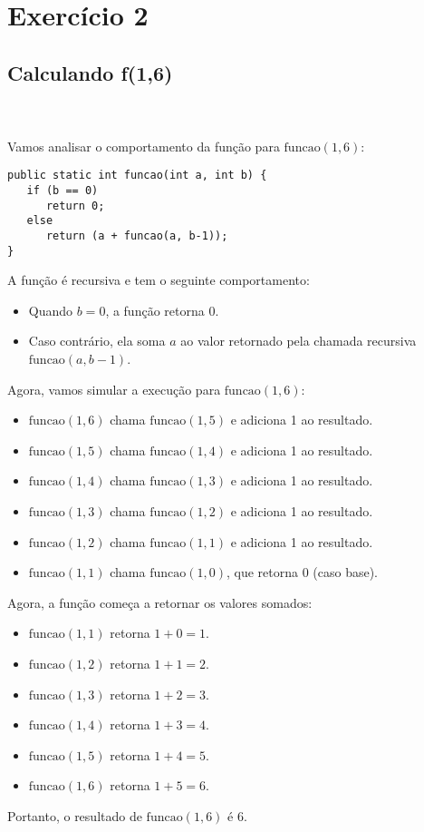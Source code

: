 \documentclass[11pt,reqno,a4paper]{amsart}
\begin{document}
\newpage
\section{Exercício 2}
\subsection{Calculando f(1,6)}
\
\\
\\
Vamos analisar o comportamento da função para \( \text{funcao}(1, 6) \):

\begin{verbatim}
public static int funcao(int a, int b) {
   if (b == 0)
      return 0;
   else
      return (a + funcao(a, b-1));
}    
\end{verbatim}

A função é recursiva e tem o seguinte comportamento:
\begin{itemize}
  \item Quando \( b = 0 \), a função retorna 0.
  \item Caso contrário, ela soma \( a \) ao valor retornado pela chamada recursiva \( \text{funcao}(a, b-1) \).
\end{itemize}

Agora, vamos simular a execução para \( \text{funcao}(1, 6) \):
\begin{itemize}
    \item \( \text{funcao}(1, 6) \) chama \( \text{funcao}(1, 5) \) e adiciona 1 ao resultado.
    \item \( \text{funcao}(1, 5) \) chama \( \text{funcao}(1, 4) \) e adiciona 1 ao resultado.
    \item \( \text{funcao}(1, 4) \) chama \( \text{funcao}(1, 3) \) e adiciona 1 ao resultado.
    \item \( \text{funcao}(1, 3) \) chama \( \text{funcao}(1, 2) \) e adiciona 1 ao resultado.
    \item \( \text{funcao}(1, 2) \) chama \( \text{funcao}(1, 1) \) e adiciona 1 ao resultado.
    \item \( \text{funcao}(1, 1) \) chama \( \text{funcao}(1, 0) \), que retorna 0 (caso base).
\end{itemize}


Agora, a função começa a retornar os valores somados: 
\begin{itemize}
   \item \( \text{funcao}(1, 1) \) retorna \( 1 + 0 = 1 \).
   \item \( \text{funcao}(1, 2) \) retorna \( 1 + 1 = 2 \).
   \item \( \text{funcao}(1, 3) \) retorna \( 1 + 2 = 3 \).
   \item \( \text{funcao}(1, 4) \) retorna \( 1 + 3 = 4 \).
   \item \( \text{funcao}(1, 5) \) retorna \( 1 + 4 = 5 \).
   \item \( \text{funcao}(1, 6) \) retorna \( 1 + 5 = 6 \).
\end{itemize}
Portanto, o resultado de \( \text{funcao}(1, 6) \) é $6$.
\\
\\
\end{document}
